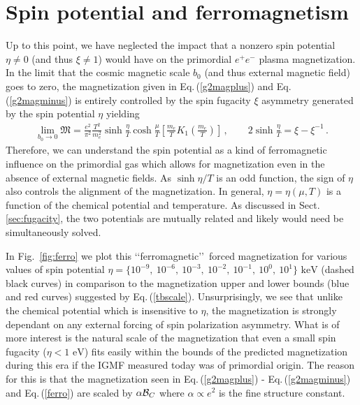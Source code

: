 \documentclass[a4paper]{article}
\newcommand*{\keV}{\text{ keV}}
\newcommand*{\eV}{\text{ eV}}
\newcommand{\req}[1]{Eq.\,(\ref{#1})}
\newcommand{\rf}[1]{Fig.~{\ref{#1}}}
\newcommand{\rsec}[1]{Sect.\,{\ref{#1}}}
\begin{document}
\section{Spin potential and ferromagnetism}
\label{sec:spin}
\noindent Up to this point, we have neglected the impact that a nonzero spin potential $\eta\neq0$ (and thus $\xi\neq1$) would have on the primordial $e^{+}e^{-}$ plasma magnetization. In the limit that the cosmic magnetic scale $b_{0}$ (and thus external magnetic field) goes to zero, the magnetization given in \req{g2magplus} and \req{g2magminus} is entirely controlled by the spin fugacity $\xi$ asymmetry generated by the spin potential $\eta$ yielding
\begin{align}
    \label{ferro}
    \lim_{b_{0}\rightarrow0}{\mathfrak M}=\frac{e^{2}}{\pi^{2}}\frac{T^{2}}{m_{e}^{2}}\sinh{\frac{\eta}{T}}\cosh{\frac{\mu}{T}}\left[\frac{m_{e}}{T}K_{1}\left(\frac{m_{e}}{T}\right)\right]\,,\qquad2\sinh{\frac{\eta}{T}}=\xi-\xi^{-1}\,.
\end{align}
Therefore, we can understand the spin potential as a kind of ferromagnetic influence on the primordial gas which allows for magnetization even in the absence of external magnetic fields. As $\sinh{\eta/T}$ is an odd function, the sign of $\eta$ also controls the alignment of the magnetization. In general, $\eta=\eta(\mu,T)$ is a function of the chemical potential and temperature. As discussed in \rsec{sec:fugacity}, the two potentials are mutually related and likely would need be simultaneously solved.

In \rf{fig:ferro} we plot this \lq\lq ferromagnetic\rq\rq\ forced magnetization for various values of spin potential $\eta=\{10^{-9},\ 10^{-6},\ 10^{-3},\ 10^{-2},\ 10^{-1},\ 10^{0},\ 10^{1}\}\keV$ (dashed black curves) in comparison to the magnetization upper and lower bounds (blue and red curves) suggested by \req{tbscale}. Unsurprisingly, we see that unlike the chemical potential which is insensitive to $\eta$, the magnetization is strongly dependant on any external forcing of spin polarization asymmetry. What is of more interest is the natural scale of the magnetization that even a small spin fugacity ($\eta<1\eV$) fits easily within the bounds of the predicted magnetization during this era if the IGMF measured today was of primordial origin. The reason for this is that the magnetization seen in \req{g2magplus} - \req{g2magminus} and \req{ferro} are scaled by $\alpha{\cal B}_{C}$ where $\alpha\propto e^{2}$ is the fine structure constant.
\end{document}
